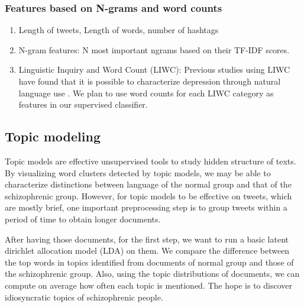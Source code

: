 \documentclass[10pt]{article}
\begin{document}
\subsubsection{Features based on N-grams and word counts}
\begin{enumerate}
\item Length of tweets, Length of words, number of hashtags
\item N-gram features: N most important ngrams based on their TF-IDF scores.
\item Linguistic Inquiry and Word Count (LIWC): Previous studies using LIWC have found that it is possible
to characterize depression through natural language use \cite{ramirez2008psychology}. We plan to use word counts for each LIWC \cite{liwc} category as features in our supervised classifier.
\end{enumerate}

\subsection{Topic modeling}

Topic models are effective unsupervised tools to study hidden structure of texts. By visualizing word clusters detected by topic models, we may be able to characterize distinctions between language of the normal group and that of the schizophrenic group. However, for topic models to be effective on tweets, which are mostly brief, one important preprocessing step is to group tweets within a period of time to obtain longer documents. 

After having those documents, for the first step, we want to run a basic latent dirichlet allocation model (LDA) on them. We compare the difference between the top words in topics identified from documents of normal group and those of the schizophrenic group. Also, using the topic distributions of documents, we can compute on average how often each topic is mentioned. The hope is to discover idiosyncratic topics of schizophrenic people. 
\end{document}
